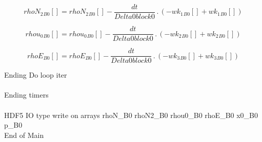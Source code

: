 \documentclass{article}
\begin{document}
\begin{dmath}{rhoN_{2}{_{B0}}}[{}] = {rhoN_{2}{_{B0}}}[{}] - \frac{dt}{Delta0block0} \,.\, \left(- {wk_{1}{_{B0}}}[{}] + {wk_{1}{_{B0}}}[{}]\right)\end{dmath}

\begin{dmath}{rhou_{0}{_{B0}}}[{}] = {rhou_{0}{_{B0}}}[{}] - \frac{dt}{Delta0block0} \,.\, \left(- {wk_{2}{_{B0}}}[{}] + {wk_{2}{_{B0}}}[{}]\right)\end{dmath}

\begin{dmath}{rhoE{_{B0}}}[{}] = {rhoE{_{B0}}}[{}] - \frac{dt}{Delta0block0} \,.\, \left(- {wk_{3}{_{B0}}}[{}] + {wk_{3}{_{B0}}}[{}]\right)\end{dmath}

\noindent Ending Do loop iter\\
\\\noindent Ending timers\\
\\\noindent HDF5 IO type write on arrays rhoN_B0 rhoN2_B0 rhou0_B0 rhoE_B0 x0_B0 p_B0\\\noindent End of Main\\
\end{document}
